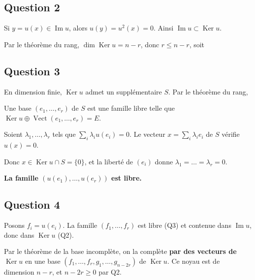 \documentclass[11pt,a4paper]{article}
\newcommand{\equationajustee}[1]{%
  \sbox{\boiteequation}{$\displaystyle #1$}%
  \ifdim\wd\boiteequation>\linewidth
    \[\resizebox{\linewidth}{!}{\usebox{\boiteequation}}\]%
  \else
    \[#1\]%
  \fi}
\begin{document}
\hypertarget{question-2}{%
\subsection{Question 2}\label{question-2}}

Si \(y=u(x)\in\operatorname{Im}u\), alors \(u(y)=u^2(x)=0\). Ainsi \(\operatorname{Im}u\subset\operatorname{Ker}u\).

Par le théorème du rang, \(\dim\operatorname{Ker}u=n-r\), donc \(r\leqslant n-r\), soit

\equationajustee{\boxed{r\leqslant\frac n2.}}

\hypertarget{question-3}{%
\subsection{Question 3}\label{question-3}}

En dimension finie, \(\operatorname{Ker}u\) admet un supplémentaire \(S\). Par le théorème du rang,

\equationajustee{\begin{aligned}
\dim S&=n-\dim\operatorname{Ker}u\\
&=n-(n-r)=r.
\end{aligned}}

Une base \((e_1,\dots,e_r)\) de \(S\) est une famille libre telle que \(\operatorname{Ker}u\oplus\operatorname{Vect}(e_1,\allowbreak \dots,\allowbreak e_r)=E\).

Soient \(\lambda_1,\dots,\lambda_r\) tels que \(\sum_i\lambda_iu(e_i)=0\). Le vecteur \(x=\sum_i\lambda_ie_i\) de \(S\) vérifie \(u(x)=0\).

Donc \(x\in\operatorname{Ker}u\cap S=\{0\}\), et la liberté de \((e_i)\) donne \(\lambda_1=\dots=\lambda_r=0\).

\textbf{La famille \((u(e_1),\dots,u(e_r))\) est libre.}

\hypertarget{question-4}{%
\subsection{Question 4}\label{question-4}}

Posons \(f_i=u(e_i)\). La famille \((f_1,\dots,f_r)\) est libre (Q3) et contenue dans \(\operatorname{Im}u\), donc dans \(\operatorname{Ker}u\) (Q2).

Par le théorème de la base incomplète, on la complète \textbf{par des vecteurs de \(\operatorname{Ker}u\)} en une base \((f_1,\dots,f_r,g_1,\dots,g_{n-2r})\) de \(\operatorname{Ker}u\). Ce noyau est de dimension \(n-r\), et \(n-2r\geqslant0\) par Q2.
\end{document}
